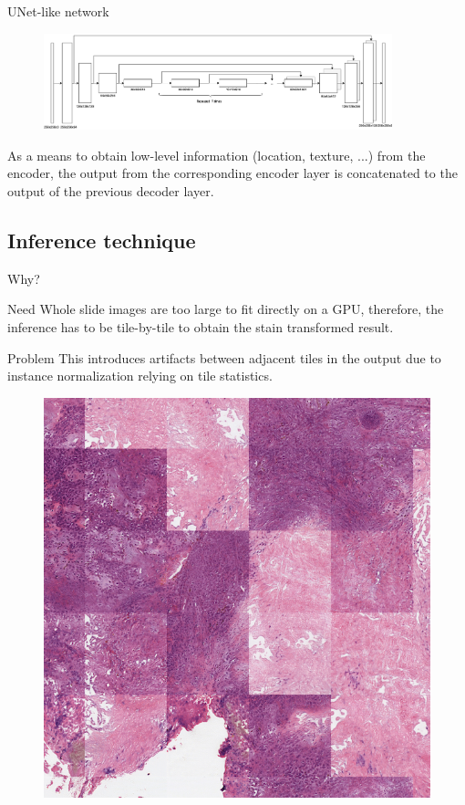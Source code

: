 \documentclass[t]{beamer}
\begin{document}
\begin{frame}{UNet-like network}

\begin{figure}
\centering
\includegraphics[width=0.9\textwidth]{unet_stain-nn}
\end{figure}

As a means to obtain low-level information
(location, texture, ...) from the encoder,
the output from the corresponding encoder layer is concatenated to the output
of the previous decoder layer.

\end{frame}

\subsection{Inference technique}

\begin{frame}{Why?}
\begin{block}{Need}
Whole slide images are too large to fit directly on a GPU, therefore,
the inference has to be tile-by-tile to obtain the stain transformed result.
\end{block}\pause

\begin{alertblock}{Problem}
This introduces artifacts between adjacent tiles in the output due to
instance normalization relying on tile statistics.
\end{alertblock}

\begin{figure}
\centering
\includegraphics[width=0.3\linewidth]{tiling-example}
\end{figure}

\end{frame}
\end{document}
